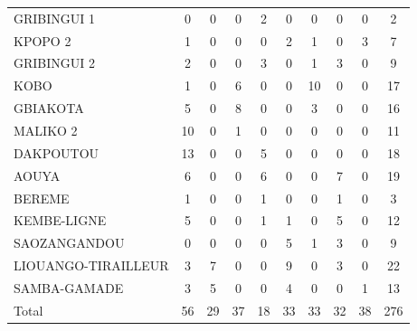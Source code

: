 {\begin{tabular}{l*{9}{c}}
GRIBINGUI 1 &              0&              0&              0&              2&              0&              0&              0&              0&              2\\
KPOPO 2     &              1&              0&              0&              0&              2&              1&              0&              3&              7\\
GRIBINGUI 2 &              2&              0&              0&              3&              0&              1&              3&              0&              9\\
KOBO        &              1&              0&              6&              0&              0&             10&              0&              0&             17\\
GBIAKOTA    &              5&              0&              8&              0&              0&              3&              0&              0&             16\\
MALIKO 2    &             10&              0&              1&              0&              0&              0&              0&              0&             11\\
DAKPOUTOU   &             13&              0&              0&              5&              0&              0&              0&              0&             18\\
AOUYA       &              6&              0&              0&              6&              0&              0&              7&              0&             19\\
BEREME      &              1&              0&              0&              1&              0&              0&              1&              0&              3\\
KEMBE-LIGNE &              5&              0&              0&              1&              1&              0&              5&              0&             12\\
SAOZANGANDOU&              0&              0&              0&              0&              5&              1&              3&              0&              9\\
LIOUANGO-TIRAILLEUR&              3&              7&              0&              0&              9&              0&              3&              0&             22\\
SAMBA-GAMADE&              3&              5&              0&              0&              4&              0&              0&              1&             13\\
Total       &             56&             29&             37&             18&             33&             33&             32&             38&            276\\
\hline\hline
\end{tabular}
}
